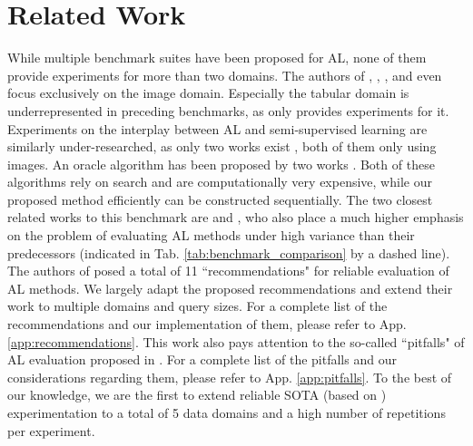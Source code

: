 \documentclass[]{article}
\begin{document}
\section{Related Work}
While multiple benchmark suites have been proposed for AL, none of them provide experiments for more than two domains.
The authors of \cite{beck2021effective}, \cite{munjal2022towards}, \cite{li2022empirical}, \cite{ji2023randomness} and \cite{luth2024navigating} even focus exclusively on the image domain.
Especially the tabular domain is underrepresented in preceding benchmarks, as only \cite{zhan2022comparative} provides experiments for it.
Experiments on the interplay between AL and semi-supervised learning are similarly under-researched, as only two works exist \cite{li2022empirical, luth2024navigating}, both of them only using images.
An oracle algorithm has been proposed by two works \cite{zhou2021towards, zhan2022comparative}. 
Both of these algorithms rely on search and are computationally very expensive, while our proposed method efficiently can be constructed sequentially.
The two closest related works to this benchmark are \cite{ji2023randomness} and \cite{luth2024navigating}, who also place a much higher emphasis on the problem of evaluating AL methods under high variance than their predecessors (indicated in Tab. \ref{tab:benchmark_comparison} by a dashed line).
The authors of \cite{ji2023randomness} posed a total of 11 ``recommendations" for reliable evaluation of AL methods.
We largely adapt the proposed recommendations and extend their work to multiple domains and query sizes.
For a complete list of the recommendations and our implementation of them, please refer to App. \ref{app:recommendations}.
This work also pays attention to the so-called ``pitfalls" of AL evaluation proposed in \cite{luth2024navigating}.
For a complete list of the pitfalls and our considerations regarding them, please refer to App. \ref{app:pitfalls}.
To the best of our knowledge, we are the first to extend reliable SOTA (based on \cite{ji2023randomness, luth2024navigating}) experimentation to a total of 5 data domains and a high number of repetitions per experiment.
\end{document}
